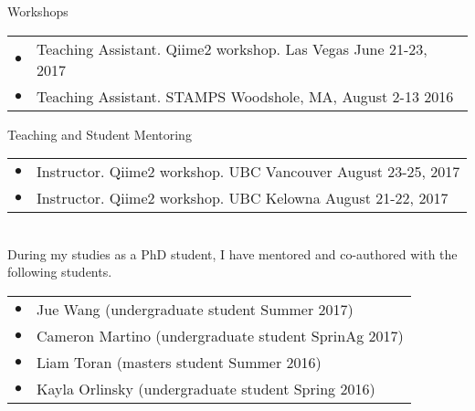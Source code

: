 \documentclass{resume} %
\begin{document}
\begin{rSection}{Workshops}
  \begin{tabular}{ll}
    $\bullet$ & Teaching Assistant. Qiime2 workshop.  Las Vegas June 21-23, 2017 \\
    $\bullet$ & Teaching Assistant. STAMPS
    Woodshole, MA, August 2-13 2016 \\
  \end{tabular}
\end{rSection}

\begin{rSection}{Teaching and Student Mentoring}
  \begin{tabular}{ll}
    $\bullet$ & Instructor. Qiime2 workshop. UBC Vancouver August 23-25, 2017 \\
    $\bullet$ & Instructor. Qiime2 workshop. UBC Kelowna August 21-22, 2017 \\
  \end{tabular}\\[5 mm]
  During my studies as a PhD student, I have mentored and co-authored with the following students.
  \begin{tabular}{ll}
    $\bullet$  &   Jue Wang (undergraduate student Summer 2017) \\
    $\bullet$  &   Cameron Martino (undergraduate student SprinAg 2017) \\
    $\bullet$  &   Liam Toran (masters student Summer 2016)\\
    $\bullet$  &   Kayla Orlinsky (undergraduate student Spring 2016) \\
  \end{tabular}
\end{rSection}
\end{document}
